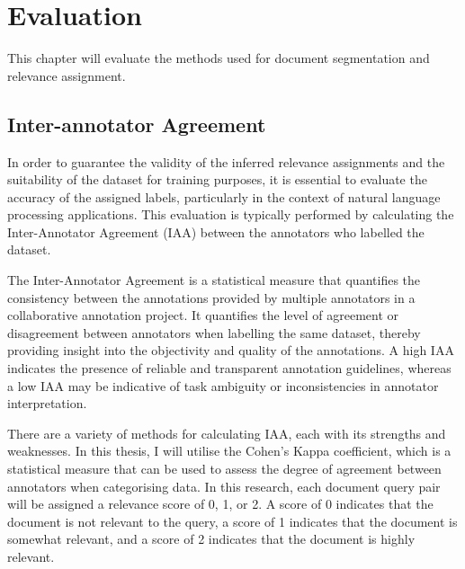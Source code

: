 \chapter{Evaluation}\label{evaluation}

This chapter will evaluate the methods used for document segmentation and relevance assignment.

\section{Inter-annotator Agreement}\label{inter-annotator-agreement}

In order to guarantee the validity of the inferred relevance assignments and the suitability of the dataset for training purposes, it is essential to evaluate the accuracy of the assigned labels, particularly in the context of natural language processing applications. This evaluation is typically performed by calculating the Inter-Annotator Agreement (IAA) between the annotators who labelled the dataset.

The Inter-Annotator Agreement is a statistical measure that quantifies the consistency between the annotations provided by multiple annotators in a collaborative annotation project. It quantifies the level of agreement or disagreement between annotators when labelling the same dataset, thereby providing insight into the objectivity and quality of the annotations. A high IAA indicates the presence of reliable and transparent annotation guidelines, whereas a low IAA may be indicative of task ambiguity or inconsistencies in annotator interpretation.

There are a variety of methods for calculating IAA, each with its strengths and weaknesses. In this thesis, I will utilise the Cohen's Kappa coefficient, which is a statistical measure that can be used to assess the degree of agreement between annotators when categorising data. In this research, each document query pair will be assigned a relevance score of 0, 1, or 2. A score of 0 indicates that the document is not relevant to the query, a score of 1 indicates that the document is somewhat relevant, and a score of 2 indicates that the document is highly relevant.


